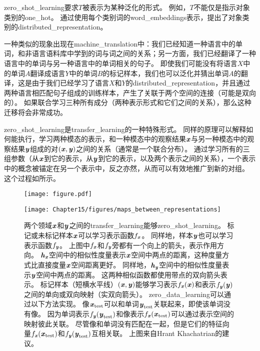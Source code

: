 
\gls{zero_shot_learning}要求$T$被表示为某种泛化的形式。
例如，$T$不能仅是指示对象类别的\gls{one_hot}。
通过使用每个类别词的\gls{word_embeddings}表示，\cite{Socher-2013}提出了对象类别的\gls{distributed_representation}。


一种类似的现象出现在\gls{machine_translation}中\citep{Klementiev-et-al-COLING2012,Mikolov-et-al-arxiv2013,Gouws-et-al-arxiv2014}：我们已经知道一种语言中的单词，和非语言语料库中学到的词与词之间的关系；另一方面，我们已经翻译了一种语言中的单词与另一种语言中的单词相关的句子。
即使我们可能没有将语言$X$中的单词$A$翻译成语言$Y$中的单词$B$的标记样本，我们也可以泛化并猜出单词$A$的翻译，这是由于我们已经学习了语言$X$和$Y$的\gls{distributed_representation}，并且通过两种语言相匹配句子组成的训练样本，产生了关联于两个空间的连接（可能是双向的）。
如果联合学习三种所有成分（两种表示形式和它们之间的关系），那么这种迁移将会非常成功。


\gls{zero_shot_learning}是\gls{transfer_learning}的一种特殊形式。
同样的原理可以解释如何能执行，学习两种模态的表示，和一种模态中的观察结果$\boldsymbol{\mathit{x}}$与另一种模态中的观察结果$\boldsymbol{\mathit{y}}$组成的对$(\boldsymbol{\mathit{x}}, \boldsymbol{\mathit{y}})$之间的关系（通常是一个联合分布）\citep{Srivastava+Salakhutdinov-NIPS2012-small}。
通过学习所有的三组参数（从$\boldsymbol{\mathit{x}}$到它的表示，从$\boldsymbol{\mathit{y}}$到它的表示，以及两个表示之间的关系），一个表示中的概念被锚定在另一个表示中，反之亦然，从而可以有效地推广到新的对组。
这个过程如所示。

\begin{figure}[!htb]
\ifOpenSource
\centerline{\texttt{[image: figure.pdf]}}
\else
\centerline{\texttt{[image: Chapter15/figures/maps\_between\_representations]}}
\fi
\caption{两个领域$\boldsymbol{\mathit{x}}$和$\boldsymbol{\mathit{y}}$之间的\gls{transfer_learning}能够\gls{zero_shot_learning}。
标记或未标记样本$\boldsymbol{\mathit{x}}$可以学习表示函数$f_{\boldsymbol{\mathit{x}}}$。
同样地，样本$\boldsymbol{\mathit{y}}$也可以学习表示函数$f_{\boldsymbol{\mathit{y}}}$。
上图中$f_{\boldsymbol{\mathit{x}}}$和$f_{\boldsymbol{\mathit{y}}}$旁都有一个向上的箭头，表示作用方向。
$\boldsymbol{\mathit{h}}_{\boldsymbol{\mathit{x}}}$空间中的相似性度量表示$\boldsymbol{\mathit{x}}$空间中两点的距离，这种度量方式比直接度量$\boldsymbol{\mathit{x}}$空间距离更好。
同样地，$\boldsymbol{\mathit{h}}_{\boldsymbol{\mathit{y}}}$空间中的相似性度量表示$\boldsymbol{\mathit{y}}$空间中两点的距离。
这两种相似函数都使用带点的双向箭头表示。
标记样本（短横水平线）$(\boldsymbol{\mathit{x}}, \boldsymbol{\mathit{y}})$能够学习表示$f_{\boldsymbol{\mathit{x}}}(\boldsymbol{\mathit{x}})$和表示$f_{\boldsymbol{\mathit{y}}}(\boldsymbol{\mathit{y}})$之间的单向或双向映射（实双向箭头）。
\gls{zero_data_learning}可以通过以下方法实现。
像$\boldsymbol{\mathit{x}}_{\text{test}}$可以和单词$\boldsymbol{\mathit{y}}_{\text{test}}$关联起来，即使该单词没有像。
因为单词表示$f_{\boldsymbol{\mathit{y}}}(\boldsymbol{\mathit{y}}_{\text{test}})$和像表示$f_{\boldsymbol{\mathit{x}}}(\boldsymbol{\mathit{x}}_{\text{test}})$可以通过表示空间的映射彼此关联。
尽管像和单词没有匹配在一起，但是它们的特征向量$f_{\boldsymbol{\mathit{x}}}(\boldsymbol{\mathit{x}}_{\text{test}})$和$f_{\boldsymbol{\mathit{y}}}(\boldsymbol{\mathit{y}}_{\text{test}})$互相关联。
上图来自Hrant Khachatrian的建议。
}
\label{fig:chap15_maps_between_representations}
\end{figure}

